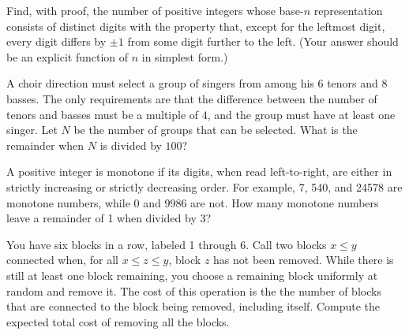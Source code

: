 \documentclass[mast]{lucky}
\begin{document}
\begin{prob}[USAMO 1990/4]{9}
Find, with proof, the number of positive integers whose base-$n$ representation consists of distinct digits with the property that, except for the leftmost digit, every digit differs by $\pm 1$ from some digit further to the left. (Your answer should be an explicit function of $n$ in simplest form.)
\end{prob}

\begin{req}[AMC 12A 2021/15]{9}
A choir direction must select a group of singers from among his $6$ tenors and $8$ basses. The only requirements are that the difference between the number of tenors and basses must be a multiple of $4$, and the group must have at least one singer. Let $N$ be the number of groups that can be selected. What is the remainder when $N$ is divided by $100$?
\end{req}

    
    \begin{prob}{13}
A positive integer is monotone if its digits, when read left-to-right, are either in strictly increasing or strictly decreasing order. For example, 7, 540, and 24578 are monotone numbers, while 0 and 9986 are not. How many monotone numbers leave a remainder of 1 when divided by 3?
\end{prob}
    
    \begin{prob}{13}
You have six blocks in a row, labeled 1 through 6. Call two blocks $x \le y$
    connected when, for all $x \le z \le y$, block $z$ has not been removed. While there is still at least one block remaining, you choose a remaining block uniformly at random and remove it. The cost of this operation is the the number of blocks that are connected to the block being removed, including itself. Compute the expected total cost of removing all the blocks.
\end{prob}
\end{document}
